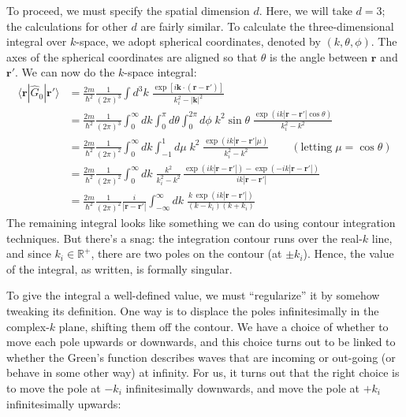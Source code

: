 \documentclass[pra,12pt]{revtex4}
\begin{document}
To proceed, we must specify the spatial dimension $d$.  Here, we will
take $d = 3$; the calculations for other $d$ are fairly similar.  To
calculate the three-dimensional integral over $k$-space, we adopt
spherical coordinates, denoted by $(k,\theta,\phi)$.  The axes of the
spherical coordinates are aligned so that $\theta$ is the angle
between $\mathbf{r}$ and $\mathbf{r}'$.  We can now do the $k$-space
integral:
$$\begin{aligned}\langle\mathbf{r}|\hat{G}_0|\mathbf{r}'\rangle &= \frac{2m}{\hbar^2} \frac{1}{(2\pi)^3} \int d^3k \; \frac{\exp\left[i\mathbf{k}\cdot (\mathbf{r}-\mathbf{r}')\right]}{k_i^2-|\mathbf{k}|^2} \\ &= \frac{2m}{\hbar^2} \frac{1}{(2\pi)^3} \int_0^\infty dk \int_0^\pi d\theta \int_{0}^{2\pi} d\phi \;k^2\sin\theta\; \frac{\displaystyle \exp\left(ik|\mathbf{r}-\mathbf{r}'|\cos\theta\right)}{k_i^2-k^2} \\ &= \frac{2m}{\hbar^2} \frac{1}{(2\pi)^2} \int_0^\infty dk \int_{-1}^1 d\mu \;k^2\; \frac{\displaystyle \exp\left(ik|\mathbf{r}-\mathbf{r}'|\mu\right)}{k_i^2-k^2} \qquad(\text{letting}\;\mu = \cos\theta) \\ &= \frac{2m}{\hbar^2} \frac{1}{(2\pi)^2} \int_0^\infty dk \; \frac{ k^2}{k_i^2-k^2}\, \frac{\displaystyle \exp\left(ik|\mathbf{r}-\mathbf{r}'|\right) - \exp\left(-ik|\mathbf{r}-\mathbf{r}'|\right)}{ik|\mathbf{r}-\mathbf{r}'|} \\ &= \frac{2m}{\hbar^2} \frac{1}{(2\pi)^2} \frac{i}{|\mathbf{r}-\mathbf{r}'|} \int_{-\infty}^\infty dk \; \frac{\displaystyle k\, \exp\left(ik|\mathbf{r}-\mathbf{r}'|\right)}{(k - k_i)(k+k_i)}\end{aligned}$$
The remaining integral looks like something we can do using contour
integration techniques.  But there's a snag: the integration contour
runs over the real-$k$ line, and since $k_i \in \mathbb{R}^+$, there
are two poles on the contour (at $\pm k_i$).  Hence, the value of the
integral, as written, is formally singular.

To give the integral a well-defined value, we must ``regularize'' it
by somehow tweaking its definition.  One way is to displace the poles
infinitesimally in the complex-$k$ plane, shifting them off the
contour.  We have a choice of whether to move each pole upwards or
downwards, and this choice turns out to be linked to whether the
Green's function describes waves that are incoming or out-going (or
behave in some other way) at infinity.  For us, it turns out that the
right choice is to move the pole at $-k_i$ infinitesimally downwards,
and move the pole at $+k_i$ infinitesimally upwards:
\end{document}

